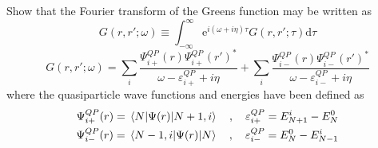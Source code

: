 \begin{exercise}
Show that the Fourier transform of the Greens function may be written as
\begin{equation}
    G(r,r';\omega) \equiv \int_{-\infty}^{\infty}\mathrm{e}^{i(\omega+i\eta)\tau}G(r,r';\tau)\mathrm{d}\tau
\end{equation}
\begin{equation}
    G(r,r';\omega) = \sum_i \dfrac{\Psi_{i+}^{QP}(r)\Psi_{i+}^{QP}(r')^{*}}{\omega - \varepsilon_{i+}^{QP} + i\eta} + \sum_i \dfrac{\Psi_{i-}^{QP}(r)\Psi_{i-}^{QP}(r')^{*}}{\omega - \varepsilon_{i-}^{QP} + i\eta}
\end{equation}
where the quasiparticle wave functions and energies have been defined as
\begin{align}\label{eq:QPdef1}
    \Psi_{i+}^{QP}(r) = \mel{N}{\Psi(r)}{N+1,i} \quad , \quad \varepsilon_{i+}^{QP} = E^{i}_{N+1} - E^{0}_{N}  \\
    \Psi_{i-}^{QP}(r) = \mel{N-1,i}{\Psi(r)}{N} \quad , \quad 
    \varepsilon_{i-}^{QP} = E^{0}_{N} - E^{i}_{N-1} \label{eq:QPdef2}
\end{align}
\end{exercise}
